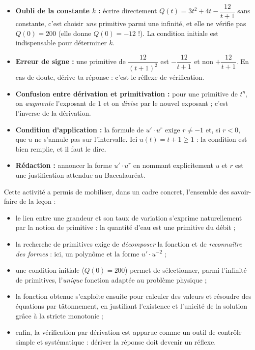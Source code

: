 \documentclass[11pt]{article}
\newcommand{\cle}[1]{{\popxbold\color{popdark}#1}}
\newcounter{popsec}
\newcounter{popsub}
\newcommand{\courssub}[1]{%
  \stepcounter{popsub}%
  \par\vspace{9pt}\noindent{\popxbold\fontsize{11.5}{13}\selectfont\color{popink}{\color{poporange}\thepopsec.\thepopsub}\hspace{6pt}#1}\par\nopagebreak\vspace{4pt}
}
\begin{document}
\begin{attention}
\begin{itemize}
\item \textbf{Oubli de la constante $k$ :} écrire directement $Q(t) = 3t^{2} + 4t - \dfrac{12}{t+1}$ sans constante, c'est choisir \emph{une} primitive parmi une infinité, et elle ne vérifie pas $Q(0) = 200$ (elle donne $Q(0) = -12$ !). La condition initiale est indispensable pour déterminer $k$.
\item \textbf{Erreur de signe :} une primitive de $\dfrac{12}{(t+1)^{2}}$ est $-\dfrac{12}{t+1}$ et non $+\dfrac{12}{t+1}$. En cas de doute, dérive ta réponse : c'est le réflexe de vérification.
\item \textbf{Confusion entre dérivation et primitivation :} pour une primitive de $t^{n}$, on \emph{augmente} l'exposant de $1$ et on \emph{divise} par le nouvel exposant ; c'est l'inverse de la dérivation.
\item \textbf{Condition d'application :} la formule de $u'\cdot u^{r}$ exige $r \neq -1$ et, si $r < 0$, que $u$ ne s'annule pas sur l'intervalle. Ici $u(t) = t+1 \geq 1$ : la condition est bien remplie, et il faut le dire.
\item \textbf{Rédaction :} annoncer la forme $u'\cdot u^{r}$ en nommant explicitement $u$ et $r$ est une justification attendue au Baccalauréat.
\end{itemize}
\end{attention}

\courssub{Bilan de l'activité}

Cette activité a permis de mobiliser, dans un cadre concret, l'ensemble des savoir-faire de la leçon :
\begin{itemize}
\item le lien entre une grandeur et son taux de variation s'exprime naturellement par la notion de \cle{primitive} : la quantité d'eau est une primitive du débit ;
\item la recherche de primitives exige de \emph{décomposer} la fonction et de \emph{reconnaître des formes} : ici, un polynôme et la forme $u'\cdot u^{-2}$ ;
\item une condition initiale ($Q(0) = 200$) permet de sélectionner, parmi l'infinité de primitives, l'\emph{unique} fonction adaptée au problème physique ;
\item la fonction obtenue s'exploite ensuite pour calculer des valeurs et résoudre des équations par tâtonnement, en justifiant l'existence et l'unicité de la solution grâce à la stricte monotonie ;
\item enfin, la \cle{vérification par dérivation} est apparue comme un outil de contrôle simple et systématique : dériver la réponse doit devenir un réflexe.
\end{itemize}
\end{document}
